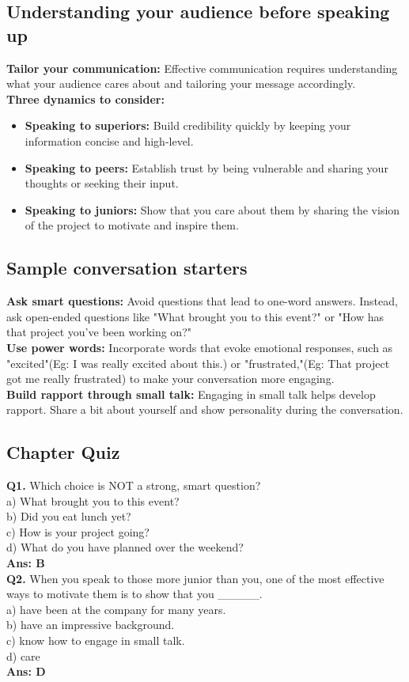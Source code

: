 \documentclass[12pt]{article}
\begin{document}
\subsection{Understanding your audience before speaking up}
\textbf{Tailor your communication:} Effective communication requires understanding what your audience cares about and tailoring your message accordingly.\\
\textbf{Three dynamics to consider:} 
\begin{itemize}
\item \textbf{Speaking to superiors:}  Build credibility quickly by keeping your information concise and high-level.
\item \textbf{Speaking to peers:}  Establish trust by being vulnerable and sharing your thoughts or seeking their input.
\item \textbf{Speaking to juniors:}  Show that you care about them by sharing the vision of the project to motivate and inspire them.
\end{itemize}

\subsection{Sample conversation starters}
\textbf{Ask smart questions:}  Avoid questions that lead to one-word answers. Instead, ask open-ended questions like "What brought you to this event?" or "How has that project you've been working on?"\\
\textbf{Use power words:}  Incorporate words that evoke emotional responses, such as "excited"(Eg: I was really excited about this.) or "frustrated,"(Eg: That project got me really frustrated)  to make your conversation more engaging.\\
\textbf{Build rapport through small talk:} Engaging in small talk helps develop rapport. Share a bit about yourself and show personality during the conversation.

\subsection{Chapter Quiz}
\textbf{Q1.} Which choice is NOT a strong, smart question?\\
 a) What brought you to this event?\\
 b) Did you eat lunch yet? \\
 c) How is your project going?\\
 d) What do you have planned over the weekend?\\
\textbf{Ans: B}\\
\textbf{Q2.} When you speak to those more junior than you, one of the most effective ways to motivate them is to show that you \_\_\_\_\_.\\
a) have been at the company for many years.\\
b) have an impressive background.\\
c) know how to engage in small talk.\\
d) care\\
\textbf{Ans: D}\\
\end{document}
